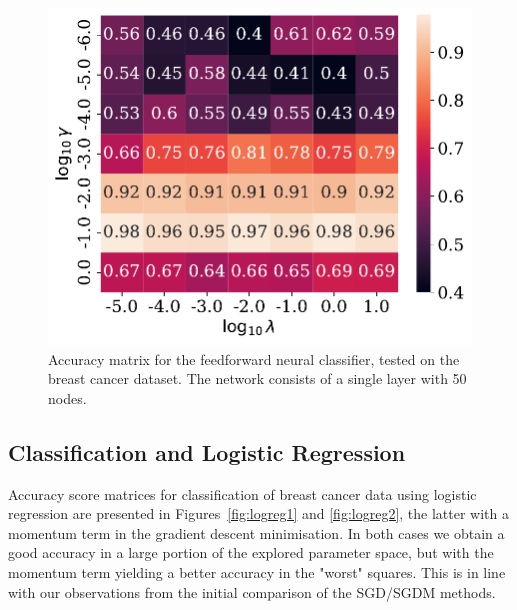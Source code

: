 \documentclass[a4paper,
amsfonts,
amssymb,
amsmath,
reprint,
showkeys,
nofootinbib,
twoside]{revtex4-2}
\begin{document}
\begin{figure}
    \centering
    \includegraphics[width = \columnwidth]{Figures/logreg.pdf}
    \caption{Accuracy matrix for the feedforward neural classifier, tested on the breast cancer dataset. The network consists of a single layer with 50 nodes.}
    \label{fig:nn3}
\end{figure}

\subsection{Classification and Logistic Regression}

Accuracy score matrices for classification of breast cancer data using logistic regression are presented in Figures~\ref{fig:logreg1} and \ref{fig:logreg2}, the latter with a momentum term in the gradient descent minimisation. In both cases we obtain a good accuracy in a large portion of the explored parameter space, but with the momentum term yielding a better accuracy in the "worst" squares. This is in line with our observations from the initial comparison of the SGD/SGDM methods.
\end{document}
